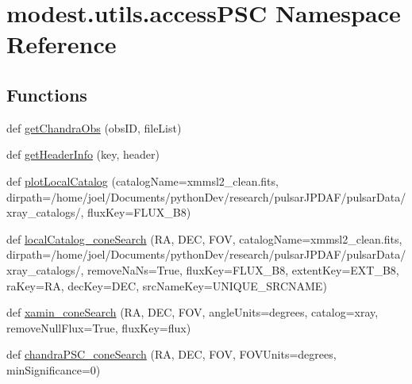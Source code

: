 \hypertarget{namespacemodest_1_1utils_1_1accessPSC}{}\section{modest.\+utils.\+access\+P\+SC Namespace Reference}
\label{namespacemodest_1_1utils_1_1accessPSC}
\subsection*{Functions}
\begin{DoxyCompactItemize}
\item 
def \hyperlink{namespacemodest_1_1utils_1_1accessPSC_ac99043193e97a4c32408a29d9313e865}{get\+Chandra\+Obs} (obs\+ID, file\+List)
\item 
def \hyperlink{namespacemodest_1_1utils_1_1accessPSC_aa906506d800e7b89d1fa46111afa08ae}{get\+Header\+Info} (key, header)
\item 
def \hyperlink{namespacemodest_1_1utils_1_1accessPSC_a98b6a5c25e92a7b93feb1b1174f7a5d6}{plot\+Local\+Catalog} (catalog\+Name=\textquotesingle{}xmmsl2\+\_\+clean.\+fits\textquotesingle{}, dirpath=\textquotesingle{}/home/joel/Documents/python\+Dev/research/pulsar\+J\+P\+D\+AF/pulsar\+Data/xray\+\_\+catalogs/\textquotesingle{}, flux\+Key=\textquotesingle{}F\+L\+U\+X\+\_\+\+B8\textquotesingle{})
\item 
def \hyperlink{namespacemodest_1_1utils_1_1accessPSC_a9723ceabaf8957cd3ccceceeab3d9376}{local\+Catalog\+\_\+cone\+Search} (RA, D\+EC, F\+OV, catalog\+Name=\textquotesingle{}xmmsl2\+\_\+clean.\+fits\textquotesingle{}, dirpath=\textquotesingle{}/home/joel/Documents/python\+Dev/research/pulsar\+J\+P\+D\+AF/pulsar\+Data/xray\+\_\+catalogs/\textquotesingle{}, remove\+Na\+Ns=True, flux\+Key=\textquotesingle{}F\+L\+U\+X\+\_\+\+B8\textquotesingle{}, extent\+Key=\textquotesingle{}E\+X\+T\+\_\+\+B8\textquotesingle{}, ra\+Key=\textquotesingle{}RA\textquotesingle{}, dec\+Key=\textquotesingle{}D\+EC\textquotesingle{}, src\+Name\+Key=\textquotesingle{}U\+N\+I\+Q\+U\+E\+\_\+\+S\+R\+C\+N\+A\+ME\textquotesingle{})
\item 
def \hyperlink{namespacemodest_1_1utils_1_1accessPSC_a2859f51b3fef3f19d8e8f4adf88c3e37}{xamin\+\_\+cone\+Search} (RA, D\+EC, F\+OV, angle\+Units=\textquotesingle{}degrees\textquotesingle{}, catalog=\textquotesingle{}xray\textquotesingle{}, remove\+Null\+Flux=True, flux\+Key=\textquotesingle{}flux\textquotesingle{})
\item 
def \hyperlink{namespacemodest_1_1utils_1_1accessPSC_a07f558b2dd595030c4692a2df47cd11e}{chandra\+P\+S\+C\+\_\+cone\+Search} (RA, D\+EC, F\+OV, F\+O\+V\+Units=\textquotesingle{}degrees\textquotesingle{}, min\+Significance=0)
\end{DoxyCompactItemize}


